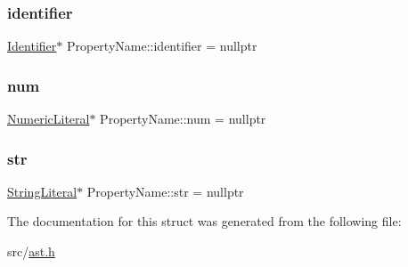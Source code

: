 \subsubsection{\texorpdfstring{identifier}{identifier}}
{\footnotesize\ttfamily \hyperlink{struct_identifier}{Identifier}$\ast$ Property\+Name\+::identifier = nullptr}

\mbox{\label{struct_property_name_a0b6bd9b7aef3f341f62d1f6a5d46a0c7}} 
\subsubsection{\texorpdfstring{num}{num}}
{\footnotesize\ttfamily \hyperlink{struct_numeric_literal}{Numeric\+Literal}$\ast$ Property\+Name\+::num = nullptr}

\mbox{\label{struct_property_name_ac3b7695087df9cdaf188fb6aecce0fa4}} 
\subsubsection{\texorpdfstring{str}{str}}
{\footnotesize\ttfamily \hyperlink{struct_string_literal}{String\+Literal}$\ast$ Property\+Name\+::str = nullptr}



The documentation for this struct was generated from the following file\+:\begin{DoxyCompactItemize}
\item 
src/\hyperlink{ast_8h}{ast.\+h}\end{DoxyCompactItemize}
